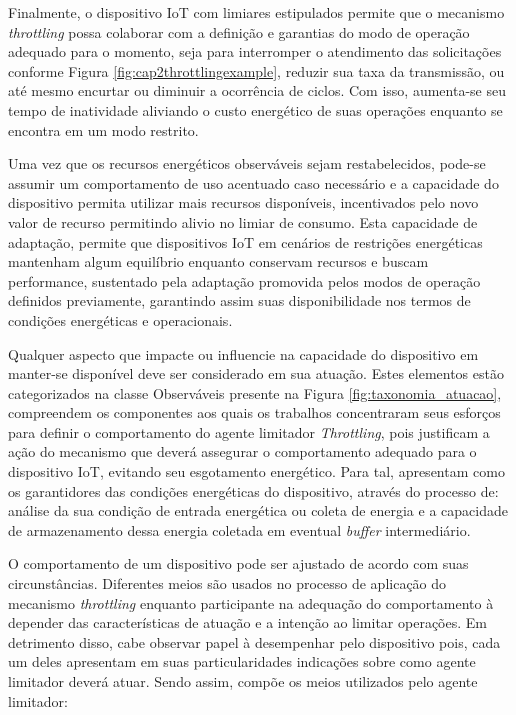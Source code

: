 Finalmente, o dispositivo \acs{IoT} com limiares estipulados permite que o mecanismo \textit{throttling} possa colaborar com a definição e garantias do modo de operação adequado para o momento, seja para interromper o atendimento das solicitações conforme Figura \ref{fig:cap2throttlingexample}, reduzir sua taxa da transmissão, ou até mesmo encurtar ou diminuir a ocorrência de ciclos. Com isso, aumenta-se seu tempo de inatividade aliviando o custo energético de suas operações enquanto se encontra em um modo restrito. 

Uma vez que os recursos energéticos observáveis sejam restabelecidos, pode-se assumir um comportamento de uso acentuado caso necessário e a capacidade do dispositivo permita utilizar mais recursos disponíveis, incentivados pelo novo valor de recurso permitindo alivio no limiar de consumo. Esta capacidade de adaptação, permite que dispositivos \acs{IoT} em cenários de restrições energéticas mantenham algum equilíbrio enquanto conservam recursos e buscam performance, sustentado pela adaptação promovida pelos modos de operação definidos previamente, garantindo assim suas disponibilidade nos termos de condições energéticas e operacionais.

Qualquer aspecto que impacte ou influencie na capacidade do dispositivo em manter-se disponível deve ser considerado em sua atuação. Estes elementos estão categorizados na classe Observáveis presente na Figura \ref{fig:taxonomia_atuacao}, compreendem os componentes aos quais os trabalhos concentraram seus esforços para definir o comportamento do agente limitador \textit{Throttling}, pois justificam a ação do mecanismo que deverá assegurar o comportamento adequado para o dispositivo \acs{IoT}, evitando seu esgotamento energético. Para tal, apresentam como os garantidores das condições energéticas do dispositivo, através do processo de: análise da sua condição de entrada energética ou coleta de energia e a capacidade de armazenamento dessa energia coletada em eventual \textit{buffer} intermediário. 

O comportamento de um dispositivo pode ser ajustado de acordo com suas circunstâncias. Diferentes meios são usados no processo de aplicação do mecanismo \textit{throttling} enquanto participante na adequação do comportamento à depender das características de atuação e a intenção ao limitar operações. Em detrimento disso, cabe observar papel à desempenhar pelo dispositivo pois, cada um deles apresentam em suas particularidades indicações sobre como agente limitador deverá atuar. Sendo assim, compõe os meios utilizados pelo agente limitador:

